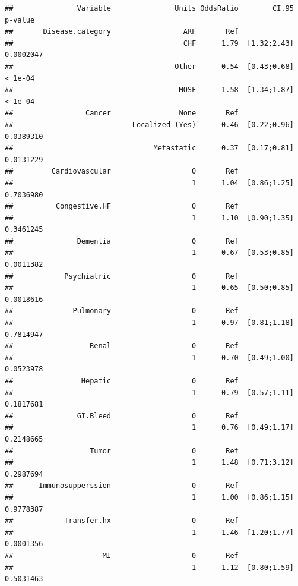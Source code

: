 \documentclass[
]{book}
\begin{document}
\begin{verbatim}
##               Variable               Units OddsRatio        CI.95     p-value 
##       Disease.category                 ARF       Ref                          
##                                        CHF      1.79  [1.32;2.43]   0.0002047 
##                                      Other      0.54  [0.43;0.68]     < 1e-04 
##                                       MOSF      1.58  [1.34;1.87]     < 1e-04 
##                 Cancer                None       Ref                          
##                            Localized (Yes)      0.46  [0.22;0.96]   0.0389310 
##                                 Metastatic      0.37  [0.17;0.81]   0.0131229 
##         Cardiovascular                   0       Ref                          
##                                          1      1.04  [0.86;1.25]   0.7036980 
##          Congestive.HF                   0       Ref                          
##                                          1      1.10  [0.90;1.35]   0.3461245 
##               Dementia                   0       Ref                          
##                                          1      0.67  [0.53;0.85]   0.0011382 
##            Psychiatric                   0       Ref                          
##                                          1      0.65  [0.50;0.85]   0.0018616 
##              Pulmonary                   0       Ref                          
##                                          1      0.97  [0.81;1.18]   0.7814947 
##                  Renal                   0       Ref                          
##                                          1      0.70  [0.49;1.00]   0.0523978 
##                Hepatic                   0       Ref                          
##                                          1      0.79  [0.57;1.11]   0.1817681 
##               GI.Bleed                   0       Ref                          
##                                          1      0.76  [0.49;1.17]   0.2148665 
##                  Tumor                   0       Ref                          
##                                          1      1.48  [0.71;3.12]   0.2987694 
##      Immunosupperssion                   0       Ref                          
##                                          1      1.00  [0.86;1.15]   0.9778387 
##            Transfer.hx                   0       Ref                          
##                                          1      1.46  [1.20;1.77]   0.0001356 
##                     MI                   0       Ref                          
##                                          1      1.12  [0.80;1.59]   0.5031463 

\end{verbatim}
\end{document}
